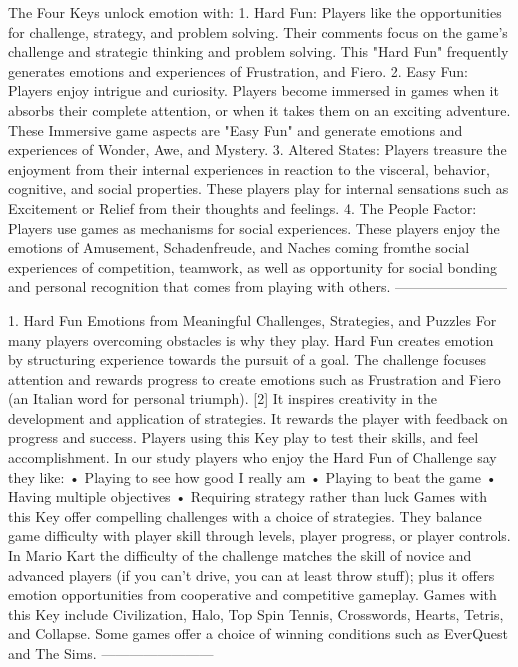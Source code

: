 The Four Keys unlock emotion with:
1. Hard Fun: Players like the opportunities for challenge, strategy, and problem
solving. Their comments focus on the game’s challenge and strategic thinking and
problem solving. This "Hard Fun" frequently generates emotions and experiences of
Frustration, and Fiero.
2. Easy Fun: Players enjoy intrigue and curiosity. Players become immersed in games
when it absorbs their complete attention, or when it takes them on an exciting
adventure. These Immersive game aspects are "Easy Fun" and generate emotions
and experiences of Wonder, Awe, and Mystery.
3. Altered States: Players treasure the enjoyment from their internal experiences in
reaction to the visceral, behavior, cognitive, and social properties. These players
play for internal sensations such as Excitement or Relief from their thoughts and
feelings.
4. The People Factor: Players use games as mechanisms for social experiences.
These players enjoy the emotions of Amusement, Schadenfreude, and Naches
coming fromthe social experiences of competition, teamwork, as well as opportunity
for social bonding and personal recognition that comes from playing with others.
------------------------

1. Hard Fun
Emotions from Meaningful Challenges, Strategies, and Puzzles
For many players overcoming obstacles is why they play. Hard Fun creates emotion by
structuring experience towards the pursuit of a goal. The challenge focuses attention and
rewards progress to create emotions such as Frustration and Fiero (an Italian word for
personal triumph). [2] It inspires creativity in the development and application of strategies. It
rewards the player with feedback on progress and success. Players using this Key play to test
their skills, and feel accomplishment. In our study players who enjoy the Hard Fun of
Challenge say they like:
• Playing to see how good I really am
• Playing to beat the game
• Having multiple objectives
• Requiring strategy rather than luck
Games with this Key offer compelling challenges with a choice of strategies. They balance
game difficulty with player skill through levels, player progress, or player controls. In Mario Kart
the difficulty of the challenge matches the skill of novice and advanced players (if you can’t
drive, you can at least throw stuff); plus it offers emotion opportunities from cooperative and
competitive gameplay. Games with this Key include Civilization, Halo, Top Spin Tennis,
Crosswords, Hearts, Tetris, and Collapse. Some games offer a choice of winning conditions
such as EverQuest and The Sims.
------------------------
